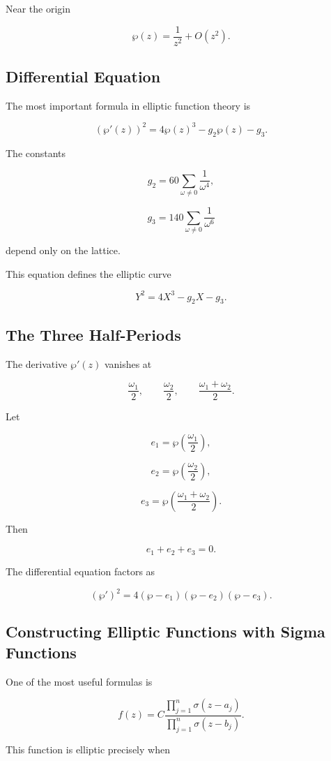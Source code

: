 \documentclass[12pt,a4paper]{article}
\theoremstyle{notespace}
\begin{document}
Near the origin

\[
\wp(z)
=
\frac1{z^2}
+
O(z^2).
\]

\subsection{Differential Equation}

The most important formula in elliptic function theory is

\[
\boxed{
	(\wp'(z))^2
	=
	4\wp(z)^3
	-
	g_2\wp(z)
	-
	g_3.
}
\]

The constants

\[
g_2
=
60
\sum_{\omega\neq 0}
\frac1{\omega^4},
\]

\[
g_3
=
140
\sum_{\omega\neq 0}
\frac1{\omega^6}
\]

depend only on the lattice.

This equation defines the elliptic curve

\[
Y^2
=
4X^3-g_2X-g_3.
\]

\subsection{The Three Half-Periods}

The derivative \(\wp'(z)\) vanishes at

\[
\frac{\omega_1}{2},
\qquad
\frac{\omega_2}{2},
\qquad
\frac{\omega_1+\omega_2}{2}.
\]

Let

\[
e_1
=
\wp\!\left(\frac{\omega_1}{2}\right),
\]

\[
e_2
=
\wp\!\left(\frac{\omega_2}{2}\right),
\]

\[
e_3
=
\wp\!\left(\frac{\omega_1+\omega_2}{2}\right).
\]

Then

\[
e_1+e_2+e_3=0.
\]

The differential equation factors as

\[
(\wp')^2
=
4
(\wp-e_1)
(\wp-e_2)
(\wp-e_3).
\]

\subsection{Constructing Elliptic Functions with Sigma Functions}

One of the most useful formulas is

\[
f(z)
=
C
\frac{
	\prod_{j=1}^{n}
	\sigma(z-a_j)
}{
	\prod_{j=1}^{n}
	\sigma(z-b_j)
}.
\]

This function is elliptic precisely when
\end{document}
